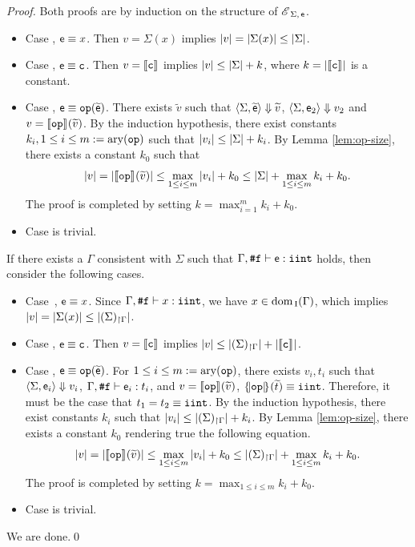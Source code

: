 \documentclass[runningheads]{llncs}
\begin{document}
\begin{proof}
Both proofs are by induction on the structure of $\mathscr{E}_{\;\Sigma,\,\mathsf{e}}$.
\begin{itemize}
    \item Case , $\mathsf{e}\equiv x$. Then $v=\Sigma(x)$ implies $\vert v\vert=\vert\Sigma(x)\vert\le\vert\Sigma\vert$.
    \item Case , $\mathsf{e}\equiv \mathtt{c}$. Then $v=\llbracket\mathtt{c}\rrbracket_{}$ implies
    $\vert v\vert\le\vert\Sigma\vert+k$, where $k=\vert\llbracket\mathtt{c}\rrbracket_{}\vert$ is a constant.
        \item Case , $\mathsf{e}\equiv \mathtt{op}(\widetilde{\mathsf{e}})$. There exists $\widetilde{v}$ such that $\langle\Sigma,\widetilde{\mathsf{e}}\rangle\Downarrow{\widetilde{v}}$, $\langle\Sigma,\mathsf{e}_2\rangle\Downarrow{v_2}$ and $v=\llbracket\texttt{op}\rrbracket_{}(\widetilde{v})$. By the induction hypothesis, there exist constants $k_i, 1\le i\le m:=\mathrm{ary}(\mathtt{op})$ such that $\vert v_i\vert\le\vert\Sigma\vert+k_i$. By Lemma \ref{lem:op-size}, there exists a constant $k_0$ such that
    \begin{equation}
        \vert v\vert=\vert\llbracket\texttt{op}\rrbracket_{}(\widetilde{v})\vert\le\max_{1\le i\le m}\vert v_i\vert+k_0\le\vert\Sigma\vert+\max_{1\le i\le m} k_i+k_0.
    \end{equation}
    The proof is completed by setting $k=\max_{i=1}^{m}k_i+k_0$.
    \item Case  is trivial.
\end{itemize}

If there exists a $\Gamma$ consistent with $\Sigma$ such that $\Gamma,\texttt{\#}\mathtt{f}\vdash\mathsf{e}:\mathtt{iint}$ holds, then consider the following cases.
    \begin{itemize}
        \item Case~, $\mathsf{e}\equiv x$.
        Since $\Gamma,\texttt{\#}\mathtt{f}\vdash x:\mathtt{iint}$, we have $x\in\mathrm{dom}_{\mathrm{\,I}}(\Gamma)$, which implies $\vert v\vert=\vert\Sigma(x)\vert\le\vert{(\Sigma)_{\restriction \Gamma}}\vert$.
    \item Case , $\mathsf{e}\equiv \mathtt{c}$.
    Then $v=\llbracket\mathtt{c}\rrbracket_{}$ implies
    $\vert v\vert\le\vert{(\Sigma)_{\restriction \Gamma}}\vert+\vert\llbracket\mathtt{c}\rrbracket_{}\vert$.
    \item Case , $\mathsf{e}\equiv \mathtt{op}(\widetilde{\mathsf{e}})$.
    For $1\le i\le m:=\mathrm{ary}(\mathtt{op})$, there exists $v_i,t_i$ such that $\langle\Sigma,\mathsf{e}_i\rangle\Downarrow{v_i}$, $\Gamma,\texttt{\#}\mathtt{f}\vdash\mathsf{e}_i:t_i$, and $v=\llbracket\mathtt{op}\rrbracket_{}(\widetilde{v})$, $\{\!|\mathtt{op}|\!\}_{}(\widetilde{t})\equiv\mathtt{iint}$.
    Therefore, it must be the case that $t_1=t_2\equiv\mathtt{iint}$.
    By the induction hypothesis, there exist constants $k_i$ such that $\vert v_i\vert\le\vert{(\Sigma)_{\restriction \Gamma}}\vert+k_i$.
    By Lemma \ref{lem:op-size}, there exists a constant $k_0$ rendering true the following equation.
    \begin{equation}
        \vert v\vert=\vert\llbracket\mathtt{op}\rrbracket_{}(\widetilde{v})\vert\le\max_{1\le i\le m} \vert v_i\vert+k_0\le\vert{(\Sigma)_{\restriction \Gamma}}\vert+\max_{1\le i\le m} k_i+k_0.
    \end{equation}
    The proof is completed by setting $k=\max_{1\le i\le m}k_i+k_0$.
    \item Case  is trivial.
    \end{itemize}
We are done.\qed
\end{proof}
\end{document}
